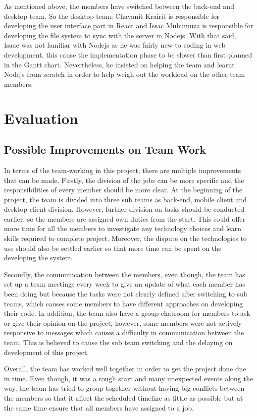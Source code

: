 \documentclass{article}
\begin{document}
As mentioned above, the members have switched between the back-end and desktop team. So the desktop team; Chayanit Krairit is responsible for developing the user interface part in React and Issac Muhumuza is responsible for developing the file system to sync with the server in Nodejs. With that said, Isaac was not familiar with Nodejs as he was fairly new to coding in web development, this cause the implementation phase to be slower than first planned in the Gantt chart. Nevertheless, he insisted on helping the team and learnt Nodejs from scratch in order to help weigh out the workload on the other team members.


\section{Evaluation}
\subsection{Possible Improvements on Team Work}
In terms of the team-working in this project, there are multiple improvements that can be made. Firstly, the division of the jobs can be more specific and the responsibilities of every member should be more clear. At the beginning of the project, the team is divided into three sub teams as back-end, mobile client and desktop client division. However, further division on tasks should be conducted earlier, so the members are assigned own duties from the start. This could offer more time for all the members to investigate any technology choices and learn skills required to complete project. Moreover, the dispute on the technologies to use should also be settled earlier so that more time can be spent on the developing the system. 

Secondly, the communication between the members, even though, the team has set up a team meetings every week to give an update of what each member has been doing but because the tasks were not clearly defined after switching to sub teams, which causes some members to have different approaches on developing their code. In addition, the team also have a group chatroom for members to ask or give their opinion on the project, however, some members were not actively responsive to messages which causes a difficulty in communication between the team. This is believed to cause the sub team switching and the delaying on development of this project. 

Overall, the team has worked well together in order to get the project done due in time. Even though, it was a rough start and many unexpected events along the way, the team has tried to group together without having big conflicts between the members so that it affect the scheduled timeline as little as possible but at the same time ensure that all members have assigned to a job.
\end{document}
